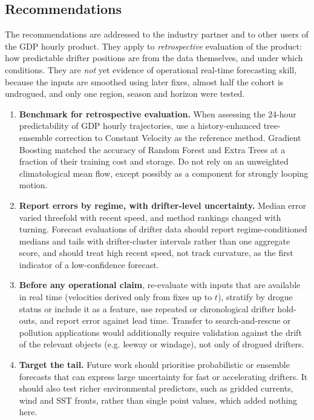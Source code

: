 \subsection{Recommendations}
The recommendations are addressed to the industry partner and to other users of the GDP hourly product. They apply to \emph{retrospective} evaluation of the product: how predictable drifter positions are from the data themselves, and under which conditions. They are \emph{not} yet evidence of operational real-time forecasting skill, because the inputs are smoothed using later fixes, almost half the cohort is undrogued, and only one region, season and horizon were tested.
\begin{enumerate}[label=\arabic*.]
  \item \textbf{Benchmark for retrospective evaluation.} When assessing the 24-hour predictability of GDP hourly trajectories, use a history-enhanced tree-ensemble correction to Constant Velocity as the reference method. Gradient Boosting matched the accuracy of Random Forest and Extra Trees at a fraction of their training cost and storage. Do not rely on an unweighted climatological mean flow, except possibly as a component for strongly looping motion.
  \item \textbf{Report errors by regime, with drifter-level uncertainty.} Median error varied threefold with recent speed, and method rankings changed with turning. Forecast evaluations of drifter data should report regime-conditioned medians and tails with drifter-cluster intervals rather than one aggregate score, and should treat high recent speed, not track curvature, as the first indicator of a low-confidence forecast.
  \item \textbf{Before any operational claim}, re-evaluate with inputs that are available in real time (velocities derived only from fixes up to $t$), stratify by drogue status or include it as a feature, use repeated or chronological drifter hold-outs, and report error against lead time. Transfer to search-and-rescue or pollution applications would additionally require validation against the drift of the relevant objects (e.g. leeway or windage), not only of drogued drifters.
  \item \textbf{Target the tail.} Future work should prioritise probabilistic or ensemble forecasts that can express large uncertainty for fast or accelerating drifters. It should also test richer environmental predictors, such as gridded currents, wind and SST fronts, rather than single point values, which added nothing here.
\end{enumerate}
